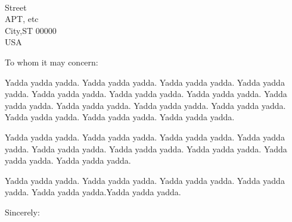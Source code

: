 \documentclass{letter}
\begin{document}
\signature{Your Name}%


\begin{letter}{\\ Street \\ APT, etc \\City,ST 00000\\ USA} %
\opening{To whom it may concern:}								%
\vspace{10pt}
Yadda yadda yadda. Yadda yadda yadda. Yadda yadda yadda. Yadda yadda yadda. Yadda yadda yadda. Yadda yadda yadda. Yadda yadda yadda. Yadda yadda yadda. Yadda yadda yadda. Yadda yadda yadda. Yadda yadda yadda. Yadda yadda yadda. Yadda yadda yadda. Yadda yadda yadda.

Yadda yadda yadda. Yadda yadda yadda. Yadda yadda yadda. Yadda yadda yadda. Yadda yadda yadda. Yadda yadda yadda. Yadda yadda yadda. Yadda yadda yadda. Yadda yadda yadda.
 
Yadda yadda yadda. Yadda yadda yadda. Yadda yadda yadda. Yadda yadda yadda.
Yadda yadda yadda.Yadda yadda yadda.

\closing{Sincerely:}


\end{letter}
\end{document}
